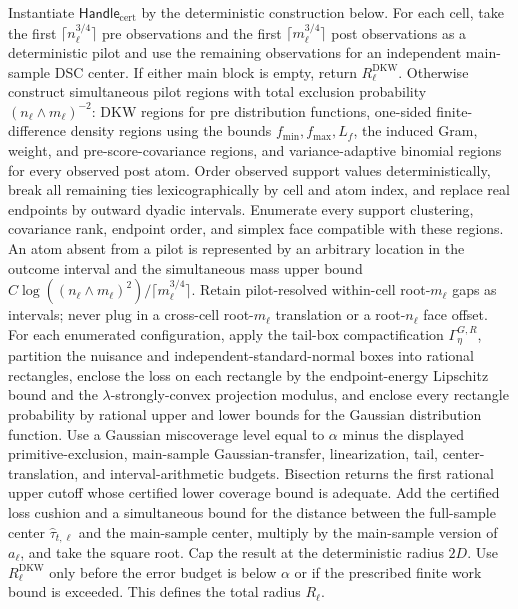 Instantiate \(\mathsf{Handle}_{\mathrm{cert}}\) by the deterministic construction below.
For each cell, take the first \(\lceil n_\ell^{3/4}\rceil\) pre observations and the first \(\lceil m_\ell^{3/4}\rceil\) post observations as a deterministic pilot and use the remaining observations for an independent main-sample DSC center.  If either main block is empty, return \(R^{\mathrm{DKW}}_\ell\).  Otherwise construct simultaneous pilot regions with total exclusion probability \((n_\ell\wedge m_\ell)^{-2}\): DKW regions for pre distribution functions, one-sided finite-difference density regions using the bounds \(f_{\min},f_{\max},L_f\), the induced Gram, weight, and pre-score-covariance regions, and variance-adaptive binomial regions for every observed post atom.  Order observed support values deterministically, break all remaining ties lexicographically by cell and atom index, and replace real endpoints by outward dyadic intervals.  Enumerate every support clustering, covariance rank, endpoint order, and simplex face compatible with these regions.  An atom absent from a pilot is represented by an arbitrary location in the outcome interval and the simultaneous mass upper bound \(C\log((n_\ell\wedge m_\ell)^2)/\lceil m_\ell^{3/4}\rceil\).  Retain pilot-resolved within-cell root-\(m_\ell\) gaps as intervals; never plug in a cross-cell root-\(m_\ell\) translation or a root-\(n_\ell\) face offset.  For each enumerated configuration, apply the tail-box compactification \(\Gamma_\eta^{G,R}\), partition the nuisance and independent-standard-normal boxes into rational rectangles, enclose the loss on each rectangle by the endpoint-energy Lipschitz bound and the \(\lambda\)-strongly-convex projection modulus, and enclose every rectangle probability by rational upper and lower bounds for the Gaussian distribution function.  Use a Gaussian miscoverage level equal to \(\alpha\) minus the displayed primitive-exclusion, main-sample Gaussian-transfer, linearization, tail, center-translation, and interval-arithmetic budgets.  Bisection returns the first rational upper cutoff whose certified lower coverage bound is adequate.  Add the certified loss cushion and a simultaneous bound for the distance between the full-sample center \(\widehat\tau_{t,\ell}\) and the main-sample center, multiply by the main-sample version of \(a_\ell\), and take the square root.  Cap the result at the deterministic radius \(2D\).  Use \(R^{\mathrm{DKW}}_\ell\) only before the error budget is below \(\alpha\) or if the prescribed finite work bound is exceeded.  This defines the total radius \(R_\ell\).

